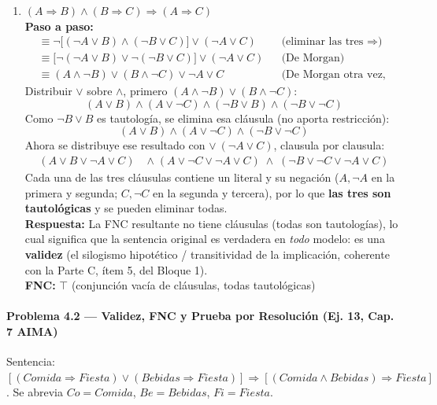 \begin{enumerate}
    \item $(A \Rightarrow B) \land (B \Rightarrow C) \Rightarrow (A \Rightarrow C)$\\
    \textbf{Paso a paso:}
    \begin{align*}
        &\equiv \neg\big[(\neg A \lor B)\land(\neg B \lor C)\big] \lor (\neg A \lor C)
        &&\text{(eliminar las tres }\Rightarrow\text{)}\\
        &\equiv \big[\neg(\neg A\lor B) \lor \neg(\neg B\lor C)\big] \lor (\neg A \lor C)
        &&\text{(De Morgan)}\\
        &\equiv (A \land \neg B) \lor (B \land \neg C) \lor \neg A \lor C
        &&\text{(De Morgan otra vez, doble negación)}
    \end{align*}
    Distribuir $\lor$ sobre $\land$, primero $(A\land\neg B)\lor(B\land\neg C)$:
    \[
        (A\lor B)\land(A\lor\neg C)\land(\neg B\lor B)\land(\neg B\lor\neg C)
    \]
    Como $\neg B \lor B$ es tautología, se elimina esa cláusula (no aporta restricción):
    \[
        (A\lor B)\land(A\lor\neg C)\land(\neg B\lor\neg C)
    \]
    Ahora se distribuye ese resultado con $\lor\ (\neg A \lor C)$, clausula por clausula:
    \begin{align*}
        (A\lor B\lor\neg A\lor C) \;&\land\; (A\lor\neg C\lor\neg A\lor C) \;\land\; (\neg B\lor\neg C\lor\neg A\lor C)
    \end{align*}
    Cada una de las tres cláusulas contiene un literal y su negación ($A,\neg A$ en la primera y
    segunda; $C,\neg C$ en la segunda y tercera), por lo que \textbf{las tres son tautológicas} y se
    pueden eliminar todas.\\
    \textbf{Respuesta:} La FNC resultante no tiene cláusulas (todas son tautologías), lo cual
    significa que la sentencia original es verdadera en \emph{todo} modelo: es una \textbf{validez}
    (el silogismo hipotético / transitividad de la implicación, coherente con la Parte C, ítem 5, del
    Bloque 1).\\
    \textbf{FNC:} $\top$ (conjunción vacía de cláusulas, todas tautológicas)
\end{enumerate}

\paragraph{Problema 4.2 --- Validez, FNC y Prueba por Resolución (Ej. 13, Cap. 7 AIMA)}

Sentencia: $[(Comida \Rightarrow Fiesta) \lor (Bebidas \Rightarrow Fiesta)] \Rightarrow [(Comida
\land Bebidas) \Rightarrow Fiesta]$. Se abrevia $Co=Comida$, $Be=Bebidas$, $Fi=Fiesta$.

